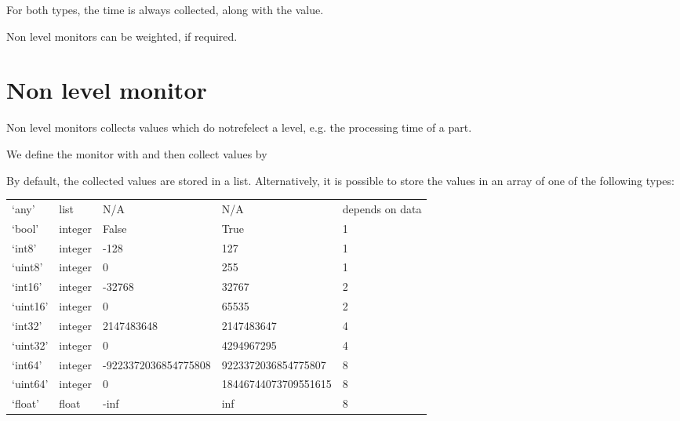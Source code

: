 \documentclass[letterpaper,10pt,english]{sphinxmanual}
\begin{document}
For both types, the time is always collected, along with the value.

Non level monitors can be weighted, if required.


\section{Non level monitor}
\label{\detokenize{Monitor:non-level-monitor}}
Non level monitors collects values which do notrefelect a level, e.g. the processing time of a part.

We define the monitor with  and then
collect values by 

By default, the collected values are stored in a list. Alternatively, it is possible to store
the values in an array of one of the following types:


\begin{savenotes}\sphinxattablestart
\centering
\begin{tabulary}{\linewidth}[t]{|T|T|T|T|T|}
\hline
{}\relax &\relax &\relax &\relax &\relax \\
\hline
‘any’
&
list
&
N/A
&
N/A
&
depends on data
\\
\hline
‘bool’
&
integer
&
False
&
True
&
1
\\
\hline
‘int8’
&
integer
&
-128
&
127
&
1
\\
\hline
‘uint8’
&
integer
&
0
&
255
&
1
\\
\hline
‘int16’
&
integer
&
-32768
&
32767
&
2
\\
\hline
‘uint16’
&
integer
&
0
&
65535
&
2
\\
\hline
‘int32’
&
integer
&
2147483648
&
2147483647
&
4
\\
\hline
‘uint32’
&
integer
&
0
&
4294967295
&
4
\\
\hline
‘int64’
&
integer
&
-9223372036854775808
&
9223372036854775807
&
8
\\
\hline
‘uint64’
&
integer
&
0
&
18446744073709551615
&
8
\\
\hline
‘float’
&
float
&
-inf
&
inf
&
8
\\
\hline
\end{tabulary}
\par
\sphinxattableend\end{savenotes}
\end{document}

